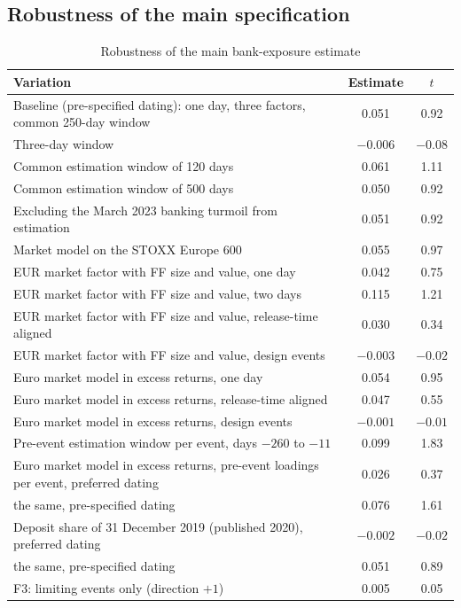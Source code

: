 \documentclass[11pt]{article}
\theoremstyle{plain}\newtheorem{proposition}{Proposition}
\begin{document}
\subsection{Robustness of the main specification}
\begin{table}[ht]\centering\small
\begin{threeparttable}
\caption{Robustness of the main bank-exposure estimate}\label{tab:robust}
\begin{tabular}{lcc}
\toprule
Variation & Estimate & $t$ \\
\midrule
Baseline (pre-specified dating): one day, three factors, common 250-day window & 0.051 & 0.92 \\
Three-day window & $-0.006$ & $-0.08$ \\
Common estimation window of 120 days & 0.061 & 1.11 \\
Common estimation window of 500 days & 0.050 & 0.92 \\
Excluding the March 2023 banking turmoil from estimation & 0.051 & 0.92 \\
Market model on the STOXX Europe 600 & 0.055 & 0.97 \\
EUR market factor with FF size and value, one day & 0.042 & 0.75 \\
EUR market factor with FF size and value, two days & 0.115 & 1.21 \\
EUR market factor with FF size and value, release-time aligned & 0.030 & 0.34 \\
EUR market factor with FF size and value, design events & $-0.003$ & $-0.02$ \\
Euro market model in excess returns, one day & 0.054 & 0.95 \\
Euro market model in excess returns, release-time aligned & 0.047 & 0.55 \\
Euro market model in excess returns, design events & $-0.001$ & $-0.01$ \\
Pre-event estimation window per event, days $-260$ to $-11$ & 0.099 & 1.83 \\
Euro market model in excess returns, pre-event loadings per event, preferred dating & 0.026 & 0.37 \\
\quad the same, pre-specified dating & 0.076 & 1.61 \\
Deposit share of 31 December 2019 (published 2020), preferred dating & $-0.002$ & $-0.02$ \\
\quad the same, pre-specified dating & 0.051 & 0.89 \\
F3: limiting events only (direction $+1$) & 0.005 & 0.05 \\

\end{tabular}
\end{threeparttable}
\end{table}
\end{document}
